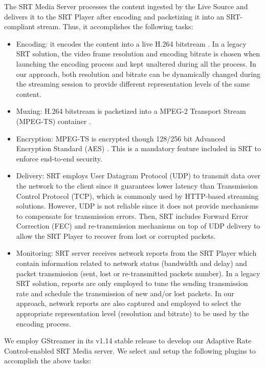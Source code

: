 The SRT Media Server processes the content ingested by the Live Source and delivers it to the SRT Player after encoding and packetizing it into an SRT-compliant stream. Thus, it accomplishes the following tasks:
\begin{itemize}
	\item Encoding: it encodes the content into a live H.264 bitstream \cite{wiegand2003}. In a legacy SRT solution, the video frame resolution and encoding bitrate is chosen when launching the encoding process and kept unaltered during all the process. In our approach, both resolution and bitrate can be dynamically changed during the streaming session to provide different representation levels of the same content.
	\item Muxing: H.264 bitstream is packetized into a MPEG-2 Transport Stream (MPEG-TS) container \cite{sarginson1996}.
	\item Encryption: MPEG-TS is encrypted though 128/256 bit Advanced Encryption Standard (AES) \cite{chown2002advanced}. This is a mandatory feature included in SRT to enforce end-to-end security.
	\item Delivery: SRT employs User Datagram Protocol (UDP) to transmit data over the network to the client since it guarantees lower latency than Transmission Control Protocol (TCP), which is commonly used by HTTP-based streaming solutions. However, UDP is not reliable since it does not provide mechanisms to compensate for transmission errors. Then, SRT includes Forward Error Correction (FEC) and re-transmission mechanisms on top of UDP delivery to allow the SRT Player to recover from lost or corrupted packets.
	\item Monitoring: SRT server receives network reports from the SRT Player which contain information related to network status (bandwidth and delay) and packet transmission (sent, lost or re-transmitted packets number). In a legacy SRT solution, reports are only employed to tune the sending transmission rate and schedule the transmission of new and/or lost packets. In our approach, network reports are also captured and employed to select the appropriate representation level (resolution and bitrate) to be used by the encoding process.
\end{itemize}

We employ GStreamer \cite{gstreamer} in its v1.14 stable release to develop our Adaptive Rate Control-enabled SRT Media server. We select and setup the following plugins to accomplish the above tasks:

